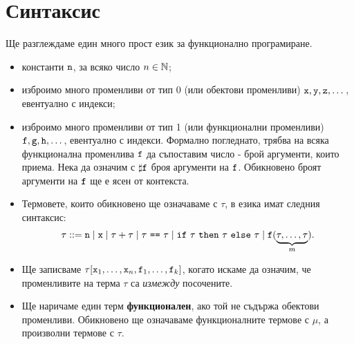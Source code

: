 \section{Синтаксис}
Ще разглеждаме един много прост език за функционално програмиране.
\begin{itemize}
\item
  константи $\texttt{n}$, за всяко число $n \in \mathbb{N}$;
\item
  изброимо много променливи от тип 0 (или обектови променливи) $\texttt{x}, \texttt{y}, \texttt{z}, \dots$, евентуално с индекси;
\item
  изброимо много променливи от тип 1 (или функционални променливи) $\texttt{f},\texttt{g},\texttt{h},\dots$, евентуално с индекси. 
  Формално погледнато, трябва на всяка функционална променлива $\texttt{f}$
  да съпоставим число - брой аргументи, които приема. Нека да означим с $\sharp\texttt{f}$ броя аргументи на $\texttt{f}$.
  Обикновено броят аргументи на $\texttt{f}$ ще е ясен от контекста.
\item
  Термовете, които обикновено ще означаваме с $\tau$, в езика \REC имат следния синтаксис:
  \[\tau ::= \texttt{n} \mid \texttt{x} \mid \tau + \tau \mid \tau\ \texttt{==}\ \tau \mid \texttt{if}\ \tau\ \texttt{then}\ \tau\ \texttt{else}\ \tau \mid \texttt{f}(\underbrace{\tau,\dots,\tau}_{m}).\]
\item
  Ще записваме $\tau[\texttt{x}_1,\dots,\texttt{x}_n,\texttt{f}_1,\dots,\texttt{f}_k]$, когато искаме да означим, че променливите
  на терма $\tau$ са {\em измежду} посочените.
\item
  Ще наричаме един терм {\bf функционален}, ако той не съдържа обектови променливи.
  Обикновено ще означаваме функционалните термове с $\mu$, а произволни термове с $\tau$.

\end{itemize}

